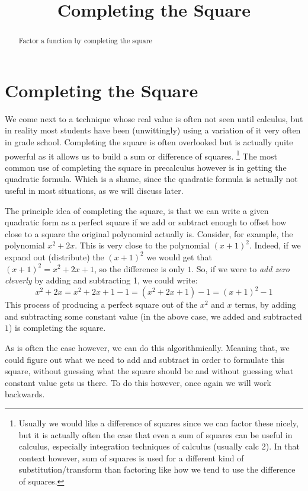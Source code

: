\documentclass{ximeraXloud}
\title{Completing the Square}
\begin{document}
\begin{abstract}
    Factor a function by completing the square
\end{abstract}
\maketitle

\section*{Completing the Square}
    We come next to a technique whose real value is often not seen until calculus, but in reality most students have been (unwittingly) using a variation of it very often in grade school. Completing the square is often overlooked but is actually quite powerful as it allows us to build a sum or difference of squares.%
    \footnote{Usually we would like a difference of squares since we can factor these nicely, but it is actually often the case that even a sum of squares can be useful in calculus, especially integration techniques of calculus (usually calc 2). In that context however, sum of squares is used for a different kind of substitution/transform than factoring like how we tend to use the difference of squares.}
    The most common use of completing the square in precalculus however is in getting the quadratic formula. Which is a shame, since the quadratic formula is actually not useful in most situations, as we will discuss later.
    
    The principle idea of completing the square, is that we can write a given quadratic form as a perfect square if we add or subtract enough to offset how close to a square the original polynomial actually is. Consider, for example, the polynomial $x^2 + 2x$. This is very close to the polynomial $(x+1)^2$. Indeed, if we expand out (distribute) the $(x+1)^2$ we would get that $(x+1)^2 = x^2 + 2x + 1$, so the difference is only $1$. So, if we were to \textit{add zero cleverly} by adding and subtracting 1, we could write: 
    \[
        x^2 + 2x = x^2 + 2x + 1 - 1 = (x^2 + 2x + 1) - 1 = (x+1)^2 - 1
    \]
    This process of producing a perfect square out of the $x^2$ and $x$ terms, by adding and subtracting some constant value (in the above case, we added and subtracted $1$) is completing the square.
    
    As is often the case however, we can do this algorithmically. Meaning that, we could figure out what we need to add and subtract in order to formulate this square, without guessing what the square should be and without guessing what constant value gets us there. To do this however, once again we will work backwards.
    
\end{document}
